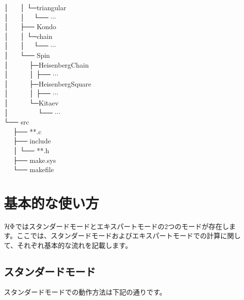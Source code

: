 │  ~~  │  └─triangular\\
│  ~~  │  ~~└── $\cdots$\\
│  ~~  ├── Kondo\\
│  ~~  │  └─chain\\
│  ~~  │  ~~└── $\cdots$\\
│  ~~  └── Spin\\
│  ~~  ~~  ├─HeisenbergChain\\
│  ~~  ~~  │  ├── $\cdots$\\
│  ~~  ~~  ├─HeisenbergSquare\\
│  ~~  ~~  │  ├── $\cdots$\\
│  ~~  ~~  └─Kitaev\\
│  ~~  ~~  ~~  └── $\cdots$\\
└── src\\
  ~~ ├── **.c\\
  ~~ ├── include\\
  ~~ │   └── **.h\\
  ~~ ├── make.sys\\
  ~~ └── makefile\\

\newpage
\section{基本的な使い方}
$\mathcal{H} \Phi$ではスタンダードモードとエキスパートモードの2つのモードが存在します。ここでは、スタンダードモードおよびエキスパートモードでの計算に関して、それぞれ基本的な流れを記載します。

\subsection{スタンダードモード}
スタンダードモードでの動作方法は下記の通りです。


